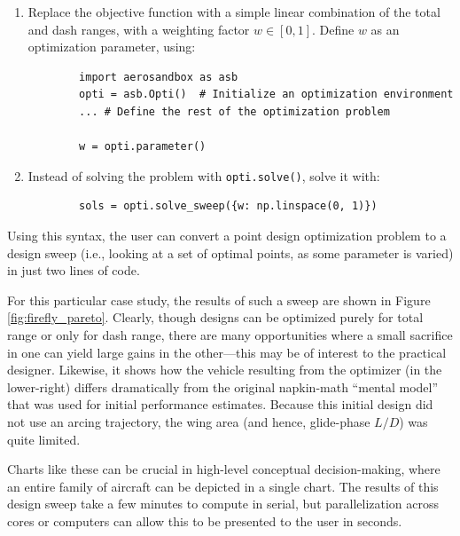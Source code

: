 \begin{enumerate}[noitemsep]
    \item Replace the objective function with a simple linear combination of the total and dash ranges, with a weighting factor $w \in [0, 1]$. Define $w$ as an optimization parameter, using:
    \begin{verbatim}
        import aerosandbox as asb
        opti = asb.Opti()  # Initialize an optimization environment
        ... # Define the rest of the optimization problem

        w = opti.parameter()
    \end{verbatim}

    \item Instead of solving the problem with \texttt{opti.solve()}, solve it with:

    \begin{verbatim}
        sols = opti.solve_sweep({w: np.linspace(0, 1)})
    \end{verbatim}

\end{enumerate}

Using this syntax, the user can convert a point design optimization problem to a design sweep (i.e., looking at a set of optimal points, as some parameter is varied) in just two lines of code.

For this particular case study, the results of such a sweep are shown in Figure \ref{fig:firefly_pareto}. Clearly, though designs can be optimized purely for total range or only for dash range, there are many opportunities where a small sacrifice in one can yield large gains in the other—this may be of interest to the practical designer. Likewise, it shows how the vehicle resulting from the optimizer (in the lower-right) differs dramatically from the original napkin-math ``mental model'' that was used for initial performance estimates. Because this initial design did not use an arcing trajectory, the wing area (and hence, glide-phase $L/D$) was quite limited.

Charts like these can be crucial in high-level conceptual decision-making, where an entire family of aircraft can be depicted in a single chart. The results of this design sweep take a few minutes to compute in serial, but parallelization across cores or computers can allow this to be presented to the user in seconds.


